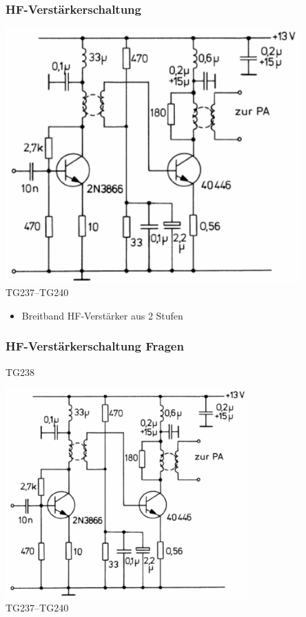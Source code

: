 \begin{frame}
  \frametitle{HF-Verstärkerschaltung}
  \begin{center}
    \includegraphics[width=0.85\textwidth,height=.7\textheight,keepaspectratio]{a07/TG237.png}\\
    {\tiny TG237--TG240 \hyperlink{refs}{\cite{bna}}}
    \begin{itemize}
      \item Breitband HF-Verstärker aus 2 Stufen
    \end{itemize}
  \end{center}
\end{frame}

\begin{frame}
  \frametitle{HF-Verstärkerschaltung Fragen}
  \begin{center}
    \begin{exampleblock}{TG238}
    \end{exampleblock}
    \includegraphics[width=0.7\textwidth,height=.5\textheight,keepaspectratio]{a07/TG237.png}\\
    {\tiny TG237--TG240 \hyperlink{refs}{\cite{bna}}}
  \end{center}
\end{frame}

